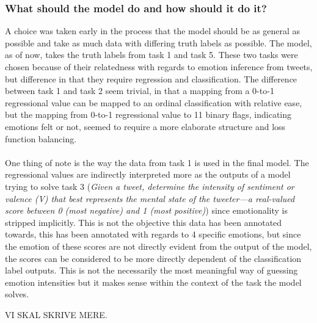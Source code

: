 \subsubsection{What should the model do and how should it do it?}
A choice was taken early in the process that the model should be as general as possible and take as much data with differing truth labels as possible. The model, as of now, takes the truth labels from task 1 and task 5. These two tasks were chosen because of their relatedness with regards to emotion inference from tweets, but difference in that they require regression and classification. The difference between task 1 and task 2 seem trivial, in that a mapping from a 0-to-1 regressional value can be mapped to an ordinal classification with relative ease, but the mapping from 0-to-1 regressional value to 11 binary flags, indicating emotions felt or not, seemed to require a more elaborate structure and loss function balancing.\\
\\
One thing of note is the way the data from task 1 is used in the final model. The regressional values are indirectly interpreted more as the outputs of a model trying to solve task 3 (\textit{Given a tweet, determine the intensity of sentiment or valence (V) that best represents the mental state of the tweeter—a real-valued score between 0 (most negative) and 1 (most positive)}) since emotionality is stripped implicitly. This is not the objective this data has been annotated towards, this has been annotated with regards to 4 specific emotions, but since the emotion of these scores are not directly evident from the output of the model, the scores can be considered to be more directly dependent of the classification label outputs. This is not the necessarily the most meaningful way of guessing emotion intensities but it makes sense within the context of the task the model solves.

VI SKAL SKRIVE MERE.\\

